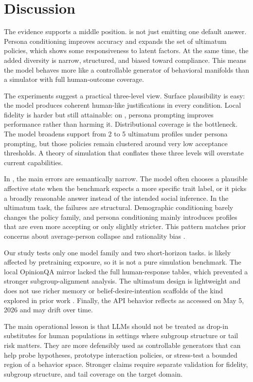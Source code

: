 \section{Discussion}
\label{sec:discussion}

 The evidence supports a middle position. \gptfourone is not just emitting one default answer. Persona conditioning improves \socialiqa accuracy and expands the set of ultimatum policies, which shows some responsiveness to latent factors. At the same time, the added diversity is narrow, structured, and biased toward compliance. This means the model behaves more like a controllable generator of behavioral manifolds than a simulator with full human-outcome coverage.

 The experiments suggest a practical three-level view. Surface plausibility is easy: the model produces coherent human-like justifications in every condition. Local fidelity is harder but still attainable: on \socialiqa, persona prompting improves performance rather than harming it. Distributional coverage is the bottleneck. The model broadens support from 2 to 5 ultimatum profiles under persona prompting, but those policies remain clustered around very low acceptance thresholds. A theory of simulation that conflates these three levels will overstate current capabilities.

 In \socialiqa, the main errors are semantically narrow. The model often chooses a plausible affective state when the benchmark expects a more specific trait label, or it picks a broadly reasonable answer instead of the intended social inference. In the ultimatum task, the failures are structural. Demographic conditioning barely changes the policy family, and persona conditioning mainly introduces profiles that are even more accepting or only slightly stricter. This pattern matches prior concerns about average-person collapse and rationality bias \cite{liu2025rational,chen2026omnibehavior}.

 Our study tests only one model family and two short-horizon tasks. \socialiqa is likely affected by pretraining exposure, so it is not a pure simulation benchmark. The local OpinionQA mirror lacked the full human-response tables, which prevented a stronger subgroup-alignment analysis. The ultimatum design is lightweight and does not use richer memory or belief-desire-intention scaffolds of the kind explored in prior work \cite{xie2024trust,park2023generative}. Finally, the API behavior reflects \gptfourone as accessed on May 5, 2026 and may drift over time.

 The main operational lesson is that LLMs should not be treated as drop-in substitutes for human populations in settings where subgroup structure or tail risk matters. They are more defensibly used as controllable generators that can help probe hypotheses, prototype interaction policies, or stress-test a bounded region of a behavior space. Stronger claims require separate validation for fidelity, subgroup structure, and tail coverage on the target domain.

